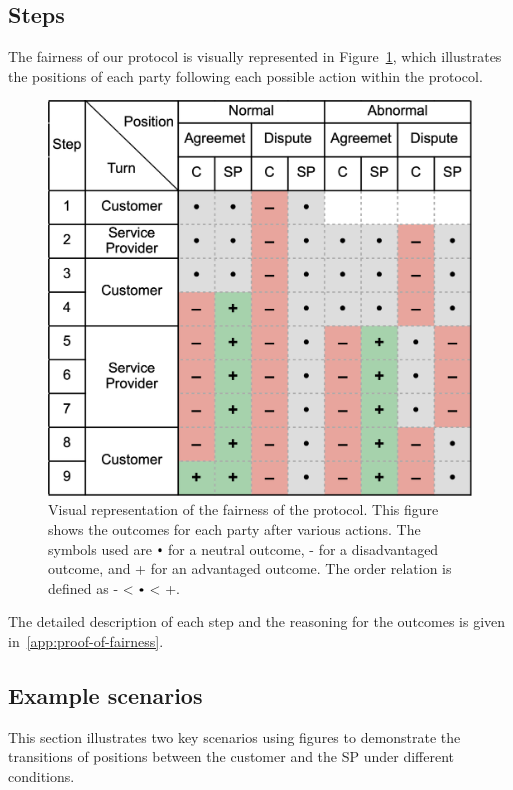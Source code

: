 \documentclass[pdftex,twocolumn,epjc3]{svjour3}
\newcommand{\plus}{+}
\newcommand{\minus}{-}
\newcommand\neutral[1][.75]{\mathbin{\ThisStyle{\vcenter{\hbox{%
  \scalebox{#1}{$\SavedStyle\bullet$}}}}}%
}
\begin{document}
\subsection{Steps}\label{sec:steps}

The fairness of our protocol is visually represented in Figure~\ref{fig:positions}, which illustrates the positions of each party following each possible action within the protocol.

\begin{figure}[h!]
\includegraphics[width=\linewidth]{model.png}
\centering
\caption{Visual representation of the fairness of the protocol. This figure shows the outcomes for each party after various actions. The symbols used are $\neutral{}$ for a neutral outcome, \minus{} for a disadvantaged outcome, and \plus{} for an advantaged outcome. The order relation is defined as \minus{} < $\neutral{}$ < \plus{}.}
\label{fig:positions}
\end{figure}

The detailed description of each step and the reasoning for the outcomes is given in~\ref{app:proof-of-fairness}.

\subsection{Example scenarios}\label{example-scenarios}
This section illustrates two key scenarios using figures to demonstrate the transitions of positions between the customer and the SP under different conditions.
\end{document}

